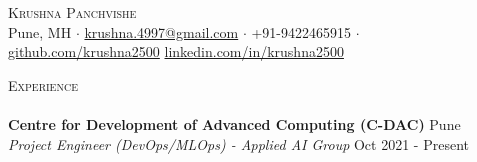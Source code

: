 \documentclass[a4paper]{article}
\newcommand{\lineunder} {
    \vspace*{-8pt} \\
    \hspace*{-18pt} \hrulefill \\
}
\newcommand{\header} [1] {
    {\hspace*{-18pt}\vspace*{6pt} \textsc{#1}}
    \vspace*{-6pt} \lineunder
}
\begin{document}
\vspace*{-40pt}



\vspace*{-10pt}
\begin{center}
    {\Huge \scshape {Krushna Panchvishe}}\\
    Pune, MH $\cdot$ \href{mailto:krushna.4997@gmail.com}{krushna.4997@gmail.com} $\cdot$ +91-9422465915 $\cdot$ \href{https://github.com/krushna2500}{github.com/krushna2500} \href{https://www.linkedin.com/in/krushna-panchvishe-ba0b6513a/}{linkedin.com/in/krushna2500}\\
\end{center}
\header{Experience}
\vspace{1mm}
\textbf{Centre for Development of Advanced Computing (C-DAC)} \hfill Pune\\
\textit{Project Engineer (DevOps/MLOps) - Applied AI Group} \hfill Oct 2021 - Present\\
\vspace{-1mm}
\end{document}
